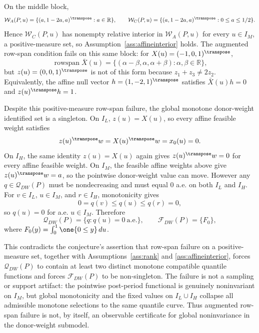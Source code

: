 On the middle block,
\[
\mathcal{W}_A(P,u)=\{(a,1-2a,a)^\transpose:a\in\mathbb R\},
\qquad
\mathcal{W}_C(P,u)=\{(a,1-2a,a)^\transpose:0\le a\le 1/2\}.
\]
Hence \(\mathcal{W}_C(P,u)\) has nonempty relative interior in \(\mathcal{W}_A(P,u)\) for every \(u\in I_M\), a positive-measure set, so Assumption~\ref{ass:affineinterior} holds.
The augmented row-span condition fails on this same block: for \(X(u)=(-1,0,1)^\transpose\),
\[
\operatorname{rowspan}\bar X(u)
=\{(\alpha-\beta,\alpha,\alpha+\beta):\alpha,\beta\in\mathbb R\},
\]
but \(z(u)=(0,0,1)^\transpose\) is not of this form because \(z_1+z_3\ne 2z_2\).
Equivalently, the affine null vector \(h=(1,-2,1)^\transpose\) satisfies \(\bar X(u)h=0\) and \(z(u)^\transpose h=1\).

Despite this positive-measure row-span failure, the global monotone donor-weight identified set is a singleton.
On \(I_L\), \(z(u)=X(u)\), so every affine feasible weight satisfies
\[
z(u)^\transpose w=X(u)^\transpose w=x_0(u)=0.
\]
On \(I_H\), the same identity \(z(u)=X(u)\) again gives \(z(u)^\transpose w=0\) for every affine feasible weight.
On \(I_M\), the feasible affine weights above give \(z(u)^\transpose w=a\), so the pointwise donor-weight value can move.
However any \(q\in\mathcal{Q}_{DW}(P)\) must be nondecreasing and must equal \(0\) a.e. on both \(I_L\) and \(I_H\).
For \(v\in I_L\), \(u\in I_M\), and \(r\in I_H\), monotonicity gives
\[
0=q(v)\le q(u)\le q(r)=0,
\]
so \(q(u)=0\) for a.e. \(u\in I_M\).
Therefore
\[
\mathcal{Q}_{DW}(P)=\{q:q(u)=0\ \text{a.e.}\},
\qquad
\mathcal{F}_{DW}(P)=\{F_0\},
\]
where \(F_0(y)=\int_0^1\one\{0\le y\}\,du\).

This contradicts the conjecture's assertion that row-span failure on a positive-measure set, together with Assumptions~\ref{ass:rank} and \ref{ass:affineinterior}, forces \(\mathcal{Q}_{DW}(P)\) to contain at least two distinct monotone compatible quantile functions and forces \(\mathcal{F}_{DW}(P)\) to be non-singleton.
The failure is not a sampling or support artifact: the pointwise post-period functional is genuinely noninvariant on \(I_M\), but global monotonicity and the fixed values on \(I_L\cup I_H\) collapse all admissible monotone selections to the same quantile curve.
Thus augmented row-span failure is not, by itself, an observable certificate for global noninvariance in the donor-weight submodel.
